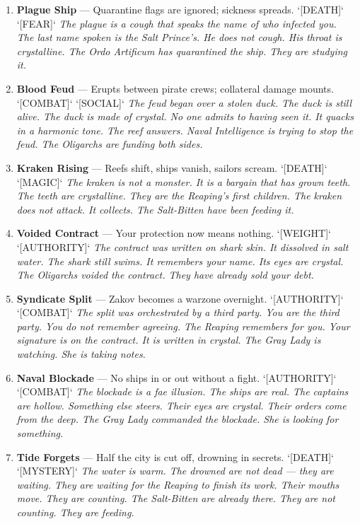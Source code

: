 \begin{enumerate}
\item \textbf{Plague Ship} --- Quarantine flags are ignored; sickness spreads. `[DEATH]` `[FEAR]`
  \hfill \textit{The plague is a cough that speaks the name of who infected you. The last name spoken is the Salt Prince's. He does not cough. His throat is crystalline. The Ordo Artificum has quarantined the ship. They are studying it.}
\item \textbf{Blood Feud} --- Erupts between pirate crews; collateral damage mounts. `[COMBAT]` `[SOCIAL]`
  \hfill \textit{The feud began over a stolen duck. The duck is still alive. The duck is made of crystal. No one admits to having seen it. It quacks in a harmonic tone. The reef answers. Naval Intelligence is trying to stop the feud. The Oligarchs are funding both sides.}
\item \textbf{Kraken Rising} --- Reefs shift, ships vanish, sailors scream. `[DEATH]` `[MAGIC]`
  \hfill \textit{The kraken is not a monster. It is a bargain that has grown teeth. The teeth are crystalline. They are the Reaping's first children. The kraken does not attack. It collects. The Salt-Bitten have been feeding it.}
\item[J] \textbf{Voided Contract} --- Your protection now means nothing. `[WEIGHT]` `[AUTHORITY]`
  \hfill \textit{The contract was written on shark skin. It dissolved in salt water. The shark still swims. It remembers your name. Its eyes are crystal. The Oligarchs voided the contract. They have already sold your debt.}
\item[Q] \textbf{Syndicate Split} --- Zakov becomes a warzone overnight. `[AUTHORITY]` `[COMBAT]`
  \hfill \textit{The split was orchestrated by a third party. You are the third party. You do not remember agreeing. The Reaping remembers for you. Your signature is on the contract. It is written in crystal. The Gray Lady is watching. She is taking notes.}
\item[K] \textbf{Naval Blockade} --- No ships in or out without a fight. `[AUTHORITY]` `[COMBAT]`
  \hfill \textit{The blockade is a fae illusion. The ships are real. The captains are hollow. Something else steers. Their eyes are crystal. Their orders come from the deep. The Gray Lady commanded the blockade. She is looking for something.}
\item[A] \textbf{Tide Forgets} --- Half the city is cut off, drowning in secrets. `[DEATH]` `[MYSTERY]`
  \hfill \textit{The water is warm. The drowned are not dead --- they are waiting. They are waiting for the Reaping to finish its work. Their mouths move. They are counting. The Salt-Bitten are already there. They are not counting. They are feeding.}
\end{enumerate}

